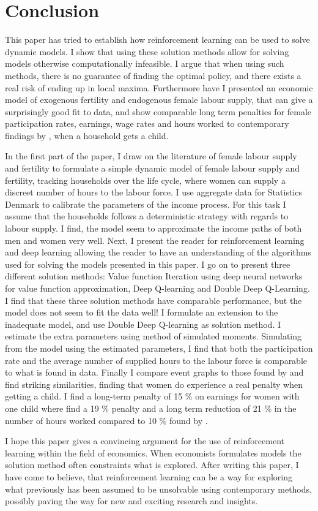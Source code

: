 \section{Conclusion}

This paper has tried to establish how reinforcement learning can be used to solve dynamic models. I show that using these solution methods allow for solving models otherwise computationally infeasible. I argue that when using such methods, there is no guarantee of finding the optimal policy, and there exists a real risk of ending up in local maxima. Furthermore have I presented an economic model of exogenous fertility and endogenous female labour supply, that can give a surprisingly good fit to data, and show comparable long term penalties for female participation rates, earnings, wage rates and hours worked to contemporary findings by \textcite{kleven_children_2019}, when a household gets a child. 

In the first part of the paper, I draw on the literature of female labour supply and fertility to formulate a simple dynamic model of female labour supply and fertility, tracking households over the life cycle, where women can supply a discreet number of hours to the labour force. I use aggregate data for Statistics Denmark to calibrate the parameters of the income process. For this task I assume that the households follows a deterministic strategy with regards to labour supply. I find, the model seem to approximate the income paths of both men and women very well. Next, I present the reader for reinforcement learning and deep learning allowing the reader to have an understanding of the algorithms used for solving the models presented in this paper.  I go on to present three different solution methods: Value function Iteration using deep neural networks for value function approximation, Deep Q-learning and Double Deep Q-Learning. I find that these three solution methods have comparable performance, but the model does not seem to fit the data well! I formulate an extension to the inadequate model, and use Double Deep Q-learning as solution method. I estimate the extra parameters using method of simulated moments. Simulating from the model using the estimated parameters, I find that both the participation rate and the average number of supplied hours to the labour force is comparable to what is found in data. Finally I compare event graphs to those found by \textcite{kleven_children_2019} and find striking similarities, finding that women do experience a real penalty when getting a child. I find a long-term penalty of 15 \% on earnings for women with one child where \textcite{kleven_children_2019} find a 19 \% penalty and a long term reduction of 21 \%  in the number of hours worked compared to 10 \% found by \textcite{kleven_children_2019}.  

I hope this paper gives a convincing argument for the use of reinforcement learning within the field of economics. When economists formulates models the solution method often constraints what is explored. After writing this paper, I have come to believe, that reinforcement learning can be a way for exploring what previously has been assumed to be unsolvable using contemporary methods, possibly paving the way for new and exciting research and insights.